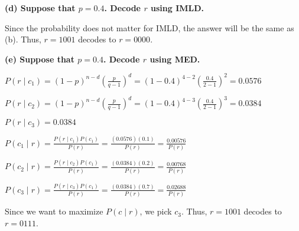 \textbf{(d) Suppose that $p=0.4$. Decode $r$ using IMLD.}

Since the probability does not matter for IMLD, the answer will be
the same as (b). Thus, $ r=1001 $ decodes to $ r=0000 $.

\textbf{(e) Suppose that $p=0.4$. Decode $r$ using MED.}

$ P(r\mid c_1)
=(1-p)^{n-d}\left( \frac{p}{q-1} \right)^d
=(1-0.4)^{4-2}\left( \frac{0.4}{2-1} \right)^{2}
=0.0576 $

$ P(r\mid c_2)
=(1-p)^{n-d}\left( \frac{p}{q-1} \right)^d
=(1-0.4)^{4-3}\left( \frac{0.4}{2-1} \right)^{3}
=0.0384 $

$ P(r\mid c_3)=0.0384 $

$ P(c_1\mid r)
=\frac{P(r\mid c_1)P(c_1)}{P(r)}
=\frac{(0.0576)(0.1)}{P(r)}
=\frac{0.00576}{P(r)} $

$ P(c_2\mid r)
=\frac{P(r\mid c_2)P(c_1)}{P(r)}
=\frac{(0.0384)(0.2)}{P(r)}
=\frac{0.00768}{P(r)} $

$ P(c_3\mid r)
=\frac{P(r\mid c_3)P(c_1)}{P(r)}
=\frac{(0.0384)(0.7)}{P(r)}
=\frac{0.02688}{P(r)} $

Since we want to maximize $ P(c\mid r) $, we pick $ c_3 $. Thus,
$ r=1001 $ decodes to $ r=0111 $.


